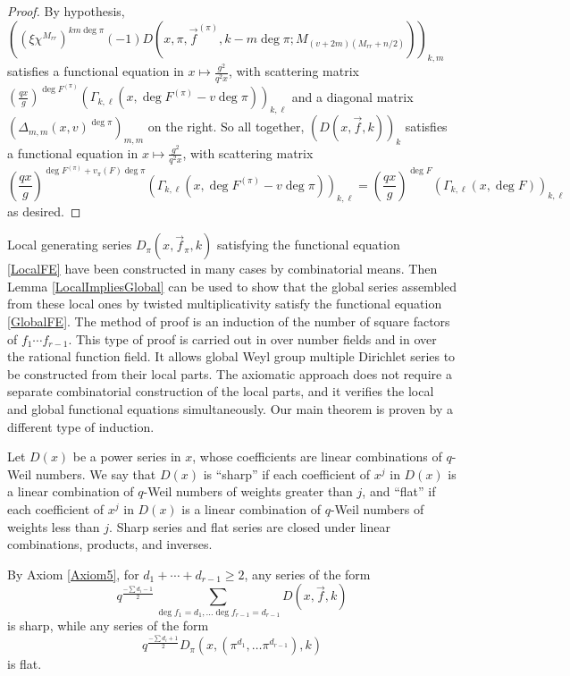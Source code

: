 \documentclass[11pt,letterpaper]{article}
\theoremstyle{definition}
\theoremstyle{remark}
\numberwithin{equation}{section}
\theoremstyle{dotless}
\begin{document}
\begin{proof}
By hypothesis, $\left( (\xi \chi^{M_{rr}})^{k m \deg \pi}(-1)D(x, \pi, \vec{f}^{(\pi)}, k-m\deg \pi; M_{(v+2m)(M_{rr}+n/2)}) \right)_{k,m}$ satisfies a functional equation in $x\mapsto \frac{g^2}{q^2 x}$, with scattering matrix $\left( \frac{qx}{g} \right)^{\deg F^{(\pi)}} \left( \Gamma_{k, \ell}(x, \deg F^{(\pi)} - v \deg \pi) \right)_{k, \ell}$ and a diagonal matrix $\left(\Delta_{m,m}(x, v)^{\deg \pi} \right)_{m,m}$ on the right. So all together, $\left( D(x, \vec{f}, k) \right)_k$ satisfies a functional equation in $x\mapsto \frac{g^2}{q^2 x}$, with scattering matrix
\begin{equation*}
\left(\frac{qx}{g}\right)^{\deg F^{(\pi)}+v_{\pi}(F) \deg \pi} \left( \Gamma_{k, \ell}(x, \deg F^{(\pi)} - v \deg \pi) \right)_{k, \ell} = \left(\frac{qx}{g}\right)^{\deg F} \left( \Gamma_{k, \ell}(x, \deg F)\right)_{k, \ell}
\end{equation*}
as desired.
\end{proof}

Local generating series $D_{\pi}(x, \vec{f}_\pi, k)$ satisfying the functional equation \eqref{LocalFE} have been constructed in many cases by combinatorial means. Then Lemma \ref{LocalImpliesGlobal} can be used to show that the global series assembled from these local ones by twisted multiplicativity satisfy the functional equation \eqref{GlobalFE}. The method of proof is an induction of the number of square factors of $f_1 \cdots f_{r-1}$. This type of proof is carried out in \cite{ChintaGunnellsJAMS} over number fields and in \cite{HFriedlander23} over the rational function field. It allows global Weyl group multiple Dirichlet series to be constructed from their local parts. The axiomatic approach does not require a separate combinatorial construction of the local parts, and it verifies the local and global functional equations simultaneously. Our main theorem is proven by a different type of induction. 

Let $D(x)$ be a power series in $x$, whose coefficients are linear combinations of $q$-Weil numbers. We say that $D(x)$ is ``sharp'' if each coefficient of $x^j$ in $D(x)$ is a linear combination of $q$-Weil numbers of weights greater than $j$, and ``flat'' if each coefficient of $x^j$ in $D(x)$ is a linear combination of $q$-Weil numbers of weights less than $j$. Sharp series and flat series are closed under linear combinations, products, and inverses.

By Axiom \ref{Axiom5}, for $d_1+\cdots+d_{r-1} \geq 2$, any series of the form
\begin{equation*}
q^{\frac{-\sum d_i-1}{2}} \sum_{\deg f_1 = d_1, \ldots \deg f_{r-1}=d_{r-1}} D(x, \vec{f}, k)
\end{equation*} 
is sharp, while any series of the form 
\begin{equation*}
q^{\frac{-\sum d_i+1}{2}}D_\pi(x, (\pi^{d_1}, \ldots \pi^{d_{r-1}}), k)
\end{equation*} is flat.
\end{document}
